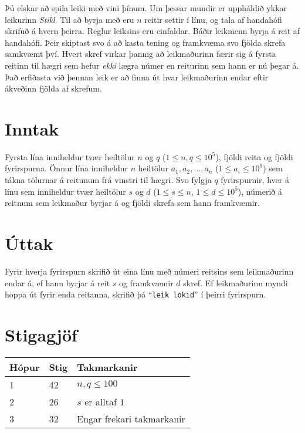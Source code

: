 %
Þú elskar að spila leiki með vini þínum. Um þessar mundir er uppháldið ykkar leikurinn \emph{Stikl}.
Til að byrja með eru $n$ reitir settir í línu, og tala af handahófi skrifuð á hvern þeirra.
Reglur leiksins eru einfaldar. Báðir leikmenn byrja á reit af handahófi. Þeir
skiptast svo á að kasta tening og framkvæma svo fjölda skrefa samkvæmt því.
Hvert skref virkar þannig að leikmaðurinn færir sig á fyrsta reitinn til hægri sem hefur \emph{ekki} lægra númer en reiturinn sem hann er nú þegar á.
Það erfiðasta við þennan leik er að finna út hvar leikmaðurinn endar eftir ákveðinn fjölda af skrefum.

\section*{Inntak}
Fyrsta lína inniheldur tvær heiltölur $n$ og $q$ ($1 \leq n, q \leq 10^5$), fjöldi reita og fjöldi fyrirspurna.
Önnur lína inniheldur $n$ heiltölur $a_1,a_2,\ldots,a_n$ ($1 \leq a_i \leq 10^9$) sem tákna tölurnar á reitunum frá vinstri til hægri.
Svo fylgja $q$ fyrirspurnir, hver á línu sem inniheldur tvær heiltölur $s$ og
$d$ ($1 \leq s \leq n$, $1 \leq d \leq 10^5$), númerið á reitnum sem
leikmaður byrjar á og fjöldi skrefa sem hann framkvæmir.

\section*{Úttak}
Fyrir hverja fyrirspurn skrifið út eina línu með númeri reitsins sem
leikmaðurinn endar á, ef hann byrjar á reit $s$ og framkvæmir $d$ skref. Ef
leikmaðurinn myndi hoppa út fyrir enda reitanna, skrifið þá ``\texttt{leik lokid}''
í þeirri fyrirspurn.

\section*{Stigagjöf}
\begin{tabular}{|l|l|l|}
\hline
Hópur & Stig & Takmarkanir \\ \hline
1     & 42   & $n, q \leq 100$ \\ \hline
2     & 26   & $s$ er alltaf $1$ \\ \hline
3     & 32   & Engar frekari takmarkanir\\ \hline
\end{tabular}

